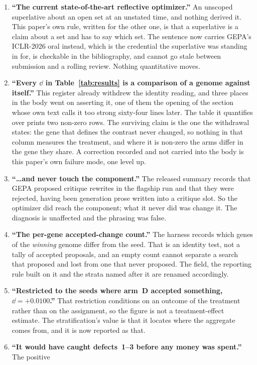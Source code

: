 \documentclass[11pt]{article}
\begin{document}
\begin{enumerate}
  \item \textbf{``The current state-of-the-art reflective optimizer.''} An unscoped superlative
    about an open set at an unstated time, and nothing derived it. This paper's own rule, written
    for the other one, is that a superlative is a claim about a set and has to say which set. The
    sentence now carries GEPA's ICLR-2026 oral instead, which is the credential the superlative
    was standing in for, is checkable in the bibliography, and cannot go stale between submission
    and a rolling review. Nothing quantitative moves.
  \item \textbf{``Every $\dd$ in Table~\ref{tab:results} is a comparison of a genome against
    itself.''} This register already withdrew the identity reading, and three places in the body
    went on asserting it, one of them the opening of the section whose own text calls it too
    strong sixty-four lines later. The table it quantifies over prints two non-zero rows. The
    surviving claim is the one the withdrawal states: the gene that defines the contrast never
    changed, so nothing in that column measures the treatment, and where it is non-zero the arms
    differ in the gene they share. A correction recorded and not carried into the body is this
    paper's own failure mode, one level up.
  \item \textbf{``\dots and never touch the component.''} The released summary records that GEPA
    proposed critique rewrites in the flagship run and that they were rejected, having been
    generation prose written into a critique slot. So the optimizer did reach the component; what
    it never did was change it. The diagnosis is unaffected and the phrasing was false.
  \item \textbf{``The per-gene accepted-change count.''} The harness records which genes of the
    \emph{winning} genome differ from the seed. That is an identity test, not a tally of accepted
    proposals, and an empty count cannot separate a search that proposed and lost from one that
    never proposed. The field, the reporting rule built on it and the strata named after it are
    renamed accordingly.
  \item \textbf{``Restricted to the seeds where arm~D accepted something, $\dd = +0.0100$.''}
    That restriction conditions on an outcome of the treatment rather than on the assignment, so
    the figure is not a treatment-effect estimate. The stratification's value is that it locates
    where the aggregate comes from, and it is now reported as that.
  \item \textbf{``It would have caught defects~1--3 before any money was spent.''} The positive

\end{enumerate}
\end{document}
